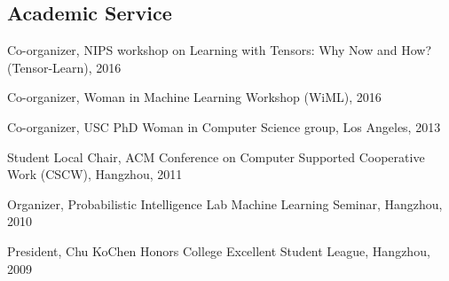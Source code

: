 \documentclass[margin,line]{res}
\newenvironment{list2}{
  \begin{list}{$\bullet$}{%
      \setlength{\itemsep}{0in}
      \setlength{\parsep}{0in} \setlength{\parskip}{0in}
      \setlength{\topsep}{0in} \setlength{\partopsep}{0in} 
      \setlength{\leftmargin}{0.2in}}}{\end{list}}
\begin{document}
\begin{resume}
\section{\sc Academic Service}
Co-organizer, NIPS workshop on Learning with Tensors: Why Now and How? (Tensor-Learn), 2016


Co-organizer, Woman in Machine Learning Workshop (WiML), 2016

Co-organizer, USC PhD Woman in Computer Science group, Los Angeles, 2013

Student Local Chair, ACM Conference on Computer Supported Cooperative Work (CSCW), Hangzhou, 2011

Organizer, Probabilistic Intelligence Lab Machine Learning Seminar, Hangzhou, 2010

President, Chu KoChen Honors College Excellent Student League, Hangzhou, 2009
%
%
%
%



\end{resume}
\end{document}
